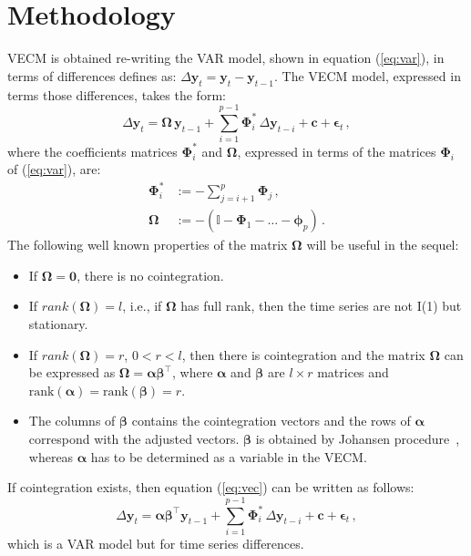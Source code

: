 \section{Methodology}

VECM is obtained re-writing the VAR model, shown in equation (\ref{eq:var}), in
terms of differences defines as: $\Delta\mathbf{y}_t=\mathbf{y}_t-\mathbf{y}_{t-1}$.
The VECM model, expressed in terms those differences, takes the form:
\begin{equation}\label{eq:vec}
\Delta \mathbf{y}_t 
= \boldsymbol{\Omega}\,\mathbf{y}_{t-1}
  + \sum_{i=1}^{p-1} \boldsymbol{\Phi}_i^*\,\Delta\mathbf{y}_{t-i}
  + \mathbf{c} + \boldsymbol{\epsilon}_t\,,
\end{equation}
\noindent
where the coefficients matrices $\boldsymbol{\Phi}_i^*$ and 
$\boldsymbol{\Omega}$, expressed in terms of the matrices
$\boldsymbol{\Phi}_i$ of (\ref{eq:var}), are:
\begin{align*}
\boldsymbol{\Phi}_i^* 
&:= -\sum_{j=i+1}^{p}\boldsymbol{\Phi}_j\,, \\
\boldsymbol{\Omega}
&:= -\left( \mathbb{I} - \boldsymbol{\Phi}_1 - \dots 
    - \boldsymbol{\phi}_p \right)\,. 
\end{align*}
The following well known properties of the matrix $\boldsymbol{\Omega}$
\cite{johansen1995} will be useful in the sequel:
\begin{itemize}
\item
If $\boldsymbol{\Omega} = \mathbf{0}$, there is no cointegration.
\item 
If $rank(\boldsymbol{\Omega})=l$, i.e., if $\boldsymbol{\Omega}$ has
full rank, then the time series are not I(1) but stationary.
\item
If $rank(\boldsymbol{\Omega})=r$, $0<r<l$, then there is cointegration
and the matrix $\boldsymbol{\Omega}$ can be expressed as
$\boldsymbol{\Omega}=\boldsymbol{\alpha\beta}^\top$, where $\boldsymbol{\alpha}$
and $\boldsymbol{\beta}$ are
$l\times r$ matrices and
$\text{rank}(\boldsymbol{\alpha})=\text{rank}(\boldsymbol{\beta})=r$.
\item
The columns of $\boldsymbol{\beta}$ contains the cointegration vectors and the rows of
$\boldsymbol{\alpha}$ correspond with the adjusted vectors. 
$\boldsymbol{\beta}$ is obtained by Johansen procedure~\cite{johansen1988},
whereas $\boldsymbol{\alpha}$ has to be determined as a variable in the VECM.
\end{itemize}

If cointegration exists, then equation (\ref{eq:vec}) can be written
as follows:
\begin{equation}\label{eq:vecfull}
\Delta\mathbf{y}_t 
= \boldsymbol{\alpha\beta}^\top\mathbf{y}_{t-1} 
  + \sum_{i=1}^{p-1}\boldsymbol{\Phi}_i^*\,\Delta\mathbf{y}_{t-i}
  + \mathbf{c} + \boldsymbol{\epsilon}_t\,,
\end{equation}
\noindent
which is a VAR model but for time series differences.

